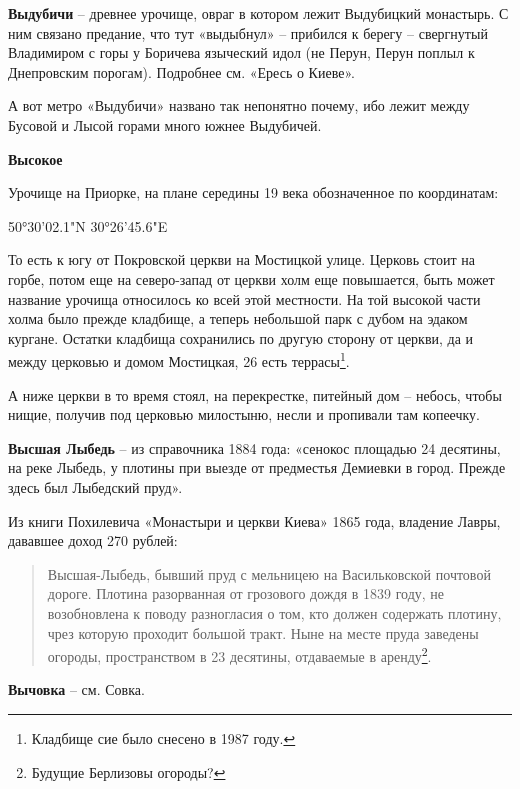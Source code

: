 \medskip


\textbf{Выдубичи} – древнее урочище, овраг в котором лежит Выдубицкий монастырь. С ним связано предание, что тут «выдыбнул» – прибился к берегу – свергнутый Владимиром с горы у Боричева языческий идол (не Перун, Перун поплыл к Днепровским порогам). Подробнее см. «Ересь о Киеве».

А вот метро «Выдубичи» названо так непонятно почему, ибо лежит между Бусовой и Лысой горами много южнее Выдубичей.\\

\medskip


\textbf{Высокое}

Урочище на Приорке, на плане середины 19 века обозначенное по координатам:

50°30'02.1"N 30°26'45.6"E

То есть к югу от Покровской церкви на Мостицкой улице. Церковь стоит на горбе, потом еще на северо-запад от церкви холм еще повышается, быть может название урочища относилось ко всей этой местности.  На той высокой части холма было прежде кладбище, а теперь небольшой парк с дубом на эдаком кургане. Остатки кладбища сохранились по другую сторону от церкви, да и между церковью и домом Мостицкая, 26 есть террасы\footnote{Кладбище сие было снесено в 1987 году.}.

А ниже церкви в то время стоял, на перекрестке, питейный дом – небось, чтобы нищие, получив под церковью милостыню, несли и пропивали там копеечку.\\

\medskip


\textbf{Высшая Лыбедь} – из справочника 1884 года: «сенокос площадью 24 десятины, на реке Лыбедь, у плотины при выезде от предместья Демиевки в город. Прежде здесь был Лыбедский пруд».

Из книги Похилевича «Монастыри и церкви Киева» 1865 года, владение Лавры, дававшее доход 270 рублей:

\begin{quotation}
\noindent Высшая-Лыбедь, бывший пруд с мельницею на Васильковской почтовой дороге. Плотина разорванная от грозового дождя в 1839 году, не возобновлена к поводу разногласия о том, кто должен содержать плотину, чрез которую проходит большой тракт. Ныне на месте пруда заведены огороды, пространством в 23 десятины, отдаваемые в аренду\footnote{Будущие Берлизовы огороды?}. 
\end{quotation}

\medskip


\textbf{Вычовка} – см. Совка.\\